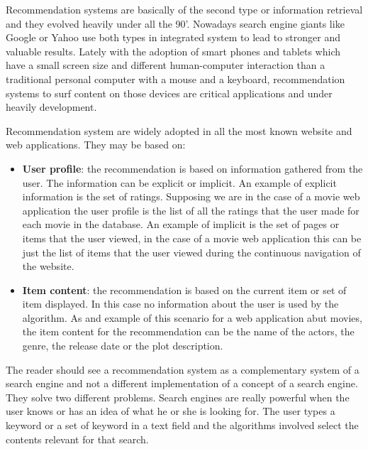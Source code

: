 Recommendation systems are basically of the second type or information retrieval and they evolved heavily under all the 90'. Nowadays search engine giants like Google or Yahoo use both types in integrated system to lead to stronger and valuable results. Lately with the adoption of smart phones and tablets which have a small screen size and different human-computer interaction than a traditional personal computer with a mouse and a keyboard, recommendation systems to surf content on those devices are critical applications and under heavily development. 

Recommendation system are widely adopted in all the most known website and web applications. They may be based on:

\begin{itemize}
\item \textbf{User profile}: the recommendation is based on information gathered from the user. The information can be explicit or implicit. An example of explicit information is the set of ratings. Supposing we are in the case of a movie web application the user profile is the list of all the ratings that the user made for each movie in the database. An example of implicit is the set of pages or items that the user viewed, in the case of a movie web application this can be just the list of items that the user viewed during the continuous navigation of the website.
\item \textbf{Item content}: the recommendation is based on the current item or set of item displayed. In this case no information about the user is used by the algorithm. As and example of this scenario for a web application abut movies, the item content for the recommendation can be the name of the actors, the genre, the release date or the plot description.
\end{itemize}

The reader should see a recommendation system as a complementary system of a search engine and not a different implementation of a concept of a search engine. They solve two different problems. Search engines are really powerful when the user knows or has an idea of what he or she is looking for. The user types a keyword or a set of keyword in a text field and the algorithms involved select the contents relevant for that search.

